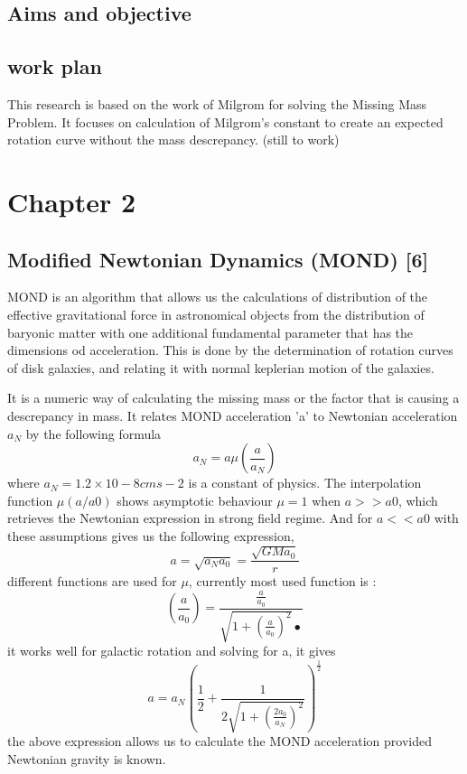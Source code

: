 \documentclass{article}
\begin{document}
\subsection{Aims and objective} 

\subsection{work plan}
 This research is based on the work of Milgrom for solving the Missing Mass Problem. It focuses on calculation of Milgrom's constant to create an expected rotation curve without the mass descrepancy. 
(still to work)

\section{Chapter 2}
\subsection{Modified Newtonian Dynamics (MOND) [6]}
MOND is an algorithm that allows us the calculations of distribution of the effective gravitational force in astronomical objects from the distribution of baryonic matter with one additional fundamental parameter that has the dimensions od acceleration. This  is done by the determination of rotation curves of disk galaxies, and relating it with normal keplerian motion of the galaxies. 

 It is a numeric way of calculating the missing mass or the factor that is causing a descrepancy in mass. It relates MOND acceleration 'a' to Newtonian acceleration $a_{N}$ by the following formula \begin{equation}
 a_{N}= a\mu(\frac{a}{a_{N}})
\end{equation}
where $a_{N} = 1.2×10-8  cms-2$  is a constant of physics. 
The interpolation function $\mu (a/a0)$ shows asymptotic behaviour $\mu=1$ when $a>> a0$,  which retrieves the Newtonian expression in strong field regime. And for $a << a0$ with these assumptions gives us the following expression, 
\begin{equation}
a= \sqrt{a_{N}a_{0}}= \frac{\sqrt{GMa_{0}}}{r}
\end{equation} 
different functions are used for $\mu$, currently most used function is :
\begin{equation}
(\frac{a}{a_{0}}) = \frac{\frac{a}{a_{0}}}{\sqrt{1+(\frac{a}{a_{0}})^2}•}
\end{equation} 
it works well for galactic rotation and solving for a, it gives 
\begin{equation}
a= a_{N}(\frac{1}{2}+\frac{1}{2\sqrt{1+(\frac{2a_{0}}{a_{N}})^2}})^\frac{1}{2}
\end{equation}
the above expression allows us to calculate the MOND acceleration provided Newtonian gravity is known.
\end{document}
